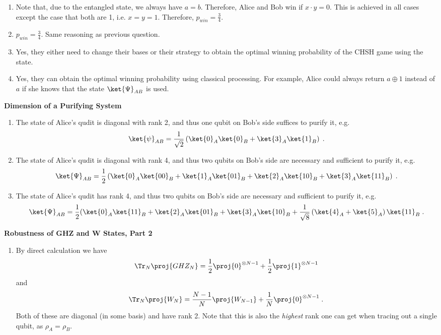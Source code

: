 \begin{exercises}
\begin{enumerate}
	\item Note that, due to the entangled state, we always have $a=b$. Therefore, Alice and Bob win if $x\cdot y=0$. This is achieved in all cases except the case that both are 1, i.e. $x=y=1$. Therefore, $p_{win}=\frac{3}{4}$.
	
	\item $p_{win}=\frac{3}{4}$. Same reasoning as previous question.
	
	\item Yes, they either need to change their bases or their strategy to obtain the optimal winning probability of the CHSH game using the state.
	
	\item Yes, they can obtain the optimal winning probability using classical processing. For example, Alice could always return $a\oplus 1$ instead of $a$ if she knows that the state $\ket{\Psi}_{AB}$ is used.
\end{enumerate}


\item {\bf Dimension of a Purifying System}
\begin{enumerate}
	\item The state of Alice's qudit is diagonal with rank 2, and thus one qubit on Bob's side suffices to purify it, e.g. $$\ket{\psi}_{AB} = \frac{1}{\sqrt {2}} \left(\ket{0}_A\ket{0}_B+\ket{3}_A\ket{1}_B \right)\;. $$
	
	\item The state of Alice's qudit is diagonal with rank 4, and thus two qubits on Bob's side are necessary and sufficient to purify it, e.g. $$ \ket{\Psi}_{AB} = \frac{1}{2} \left(\ket{0}_A\ket{00}_B +\ket{1}_A\ket{01}_B +\ket{2}_A\ket{10}_B +\ket{3}_A\ket{11}_B \right)\;. $$
	
	\item The state of Alice's qudit has rank 4, and thus two qubits on Bob's side are necessary and sufficient to purify it, e.g.
	$$\ket{\Psi}_{AB} = \frac{1}{2} (\ket{0}_A\ket{11}_B +\ket{2}_A\ket{01}_B+\ket{3}_A\ket{10}_B+\frac{1}{\sqrt{8}}\left(\ket{4}_A+\ket{5}_A\right)\ket{11}_B\;. $$
\end{enumerate}
	
	
\item {\bf Robustness of GHZ and W States, Part 2}

\begin{enumerate}
	\item By direct calculation we have $$\Tr_N \proj{GHZ_N} = \frac{1}{2}\proj{0}^{\otimes {N-1}}+\frac{1}{2}\proj{1}^{\otimes {N-1}}$$ and $$\Tr_ N \proj{W_N} = \frac{N-1}{N}\proj{W_{N-1}}+\frac{1}{N}\proj{0}^{\otimes {N-1}}\;.$$ Both of these are diagonal (in some basis) and have rank 2. Note that this is also the \emph{highest} rank one can get when tracing out a single qubit, as $\rho_A=\rho_B$.
	

\end{enumerate}
\end{exercises}
